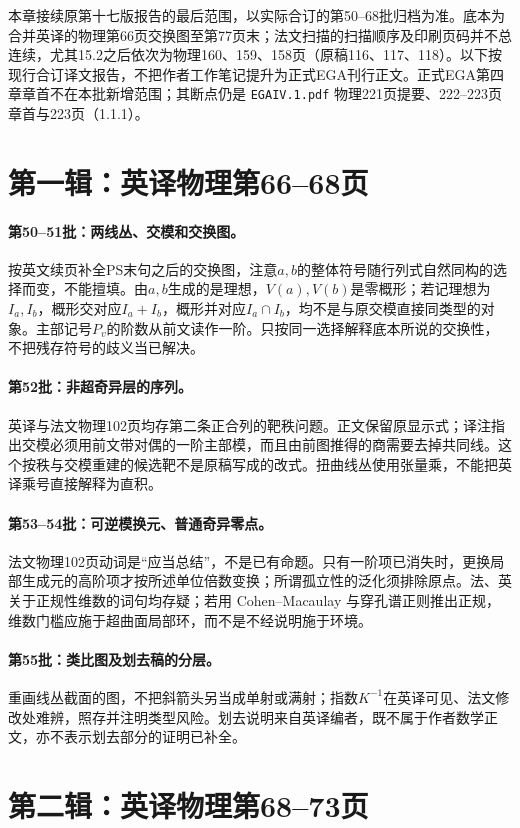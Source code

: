 \label{rep:suppIII}
本章接续原第十七版报告的最后范围，以实际合订的第50--68批归档为准。底本为合并英译的物理第66页交换图至第77页末；法文扫描的扫描顺序及印刷页码并不总连续，尤其15.2之后依次为物理160、159、158页（原稿116、117、118）。以下按现行合订译文报告，不把作者工作笔记提升为正式EGA刊行正文。正式EGA第四章章首不在本批新增范围；其断点仍是 \texttt{EGAIV.1.pdf} 物理221页提要、222--223页章首与223页（1.1.1）。
\section*{第一辑：英译物理第66--68页}
\paragraph{第50--51批：两线丛、交模和交换图。}
按英文续页补全PS末句之后的交换图，注意$a,b$的整体符号随行列式自然同构的选择而变，不能擅填。由$a,b$生成的是理想，$V(a),V(b)$是零概形；若记理想为$I_a,I_b$，概形交对应$I_a+I_b$，概形并对应$I_a\cap I_b$，均不是与原交模直接同类型的对象。主部记号$P_v$的阶数从前文读作一阶。只按同一选择解释底本所说的交换性，不把残存符号的歧义当已解决。
\paragraph{第52批：非超奇异层的序列。}
英译与法文物理102页均存第二条正合列的靶秩问题。正文保留原显示式；译注指出交模必须用前文带对偶的一阶主部模，而且由前图推得的商需要去掉共同线。这个按秩与交模重建的候选靶不是原稿写成的改式。扭曲线丛使用张量乘，不能把英译乘号直接解释为直积。
\paragraph{第53--54批：可逆模换元、普通奇异零点。}
法文物理102页动词是“应当总结”，不是已有命题。只有一阶项已消失时，更换局部生成元的高阶项才按所述单位倍数变换；所谓孤立性的泛化须排除原点。法、英关于正规性维数的词句均存疑；若用 Cohen--Macaulay 与穿孔谱正则推出正规，维数门槛应施于超曲面局部环，而不是不经说明施于环境。
\paragraph{第55批：类比图及划去稿的分层。}
重画线丛截面的图，不把斜箭头另当成单射或满射；指数$K^{-1}$在英译可见、法文修改处难辨，照存并注明类型风险。划去说明来自英译编者，既不属于作者数学正文，亦不表示划去部分的证明已补全。
\section*{第二辑：英译物理第68--73页}
